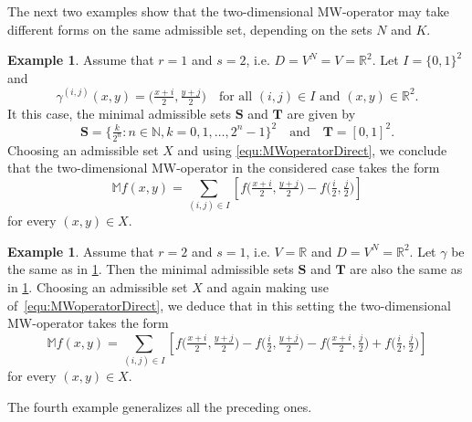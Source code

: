 \documentclass{amsart}
\theoremstyle{plain}%
\theoremstyle{definition}
\newtheorem{example}[theorem]{Example}
\theoremstyle{remark}
\begin{document}
The next two examples show that the two-dimensional MW\nobreakdash-operator may take different forms on the same admissible set, depending on the sets $N$ and $K$.

\begin{example}\label{M12}
Assume that $r=1$ and $s=2$, i.e. $D=V^N=V=\mathbb{R}^2$. Let $I=\{0,1\}^2$ and
\begin{equation*}\label{gamma}
\gamma^{(i,j)}(x,y)=\big(\tfrac{x+i}{2},\tfrac{y+j}{2}\big)\quad\text{for all }(i,j)\in I\text{ and }(x,y)\in\mathbb{R}^2.
\end{equation*}
It this case, the minimal admissible sets $\textbf{S}$ and $\textbf{T}$ are given by
\begin{equation*}\label{SgammaTgamma}
\textbf{S}=\big\{\tfrac{k}{2^n}:n\in\mathbb{N},k=0,1,\dots,2^n-1\big\}^2\quad\text{and}\quad 
\textbf{T}=[0,1]^2.
\end{equation*}
Choosing an admissible set $X$ and using \eqref{equ:MWoperatorDirect}, we conclude that the two-dimensional MW\nobreakdash-operator in the considered case takes the form
\begin{equation*}\label{equ:MWoperator12}
\mathbb{M}f(x,y)=\sum_{(i,j)\in I} \left[f\big(\tfrac{x+i}{2},\tfrac{y+j}{2}\big)-f\big(\tfrac{i}{2},\tfrac{j}{2}\big)\right]
\end{equation*}  
for every $(x,y)\in X$.
\end{example}

\begin{example}\label{M21}
Assume that $r=2$ and $s=1$, i.e. $V=\mathbb{R}$ and $D=V^N=\mathbb{R}^2$. Let $\gamma$ be the same as in \cref{M12}. Then the minimal admissible sets $\textbf{S}$ and $\textbf{T}$ are also the same as in \cref{M12}. Choosing an admissible set $X$ and again making use of~\eqref{equ:MWoperatorDirect}, we deduce that in this setting the two-dimensional MW\nobreakdash-operator takes the form
\begin{equation*}\label{equ:MWoperator21}
\mathbb{M}f(x,y)=\sum_{(i,j)\in I} \left[f\big(\tfrac{x+i}{2},\tfrac{y+j}{2}\big)-f\big(\tfrac{i}{2},\tfrac{y+j}{2}\big)
-f\big(\tfrac{x+i}{2},\tfrac{j}{2}\big)+f\big(\tfrac{i}{2},\tfrac{j}{2}\big)
\right]
\end{equation*}  
for every $(x,y)\in X$.
\end{example}

The fourth example generalizes all the preceding ones.
\end{document}
